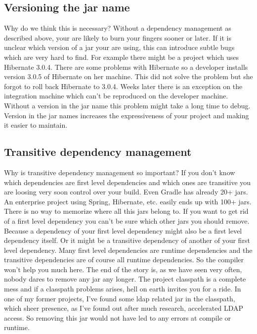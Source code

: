 \subsection{Versioning the jar name} %
\label{sub:versioning_the_jar_name}
Why do we think this is necessary? Without a dependency management as described above, your are likely to burn your fingers sooner or later. If it is unclear which version of a jar your are using, this can introduce subtle bugs which are very hard to find. For example there might be a project which uses Hibernate 3.0.4. There are some problems with Hibernate so a developer installs version 3.0.5 of Hibernate on her machine. This did not solve the problem but she forgot to roll back Hibernate to 3.0.4. Weeks later there is an exception on the integration machine which can't be reproduced on the developer machine. Without a version in the jar name this problem might take a long time to debug. Version in the jar names increases the expressiveness of your project and making it easier to maintain. 

\subsection{Transitive dependency management} %
\label{sub:transitive_dependency_management}
Why is transitive dependency management so important? If you don't know which dependencies are first level dependencies and which ones are transitive you are loosing very soon control over your build. Even Gradle has already 20+ jars. An enterprise project using Spring, Hibernate, etc. easily ends up with 100+ jars. There is no way to memorize where all this jars belong to. If you want to get rid of a first level dependency you can't be sure which other jars you should remove. Because a dependency of your first level dependency might also be a first level dependency itself. Or it might be a transitive dependency of another of your first level dependency. Many first level dependencies are runtime dependencies and the transitive dependencies are of course all runtime dependencies. So the compiler won't help you much here. The end of the story is, as we have seen very often, nobody dares to remove any jar any longer. The project classpath is a complete mess and if a classpath problems arises, hell on earth invites you for a ride. In one of my former projects, I've found some ldap related jar in the classpath, which sheer presence, as I've found out after much research, accelerated LDAP access. So removing this jar would not have led to any errors at compile or runtime. 

